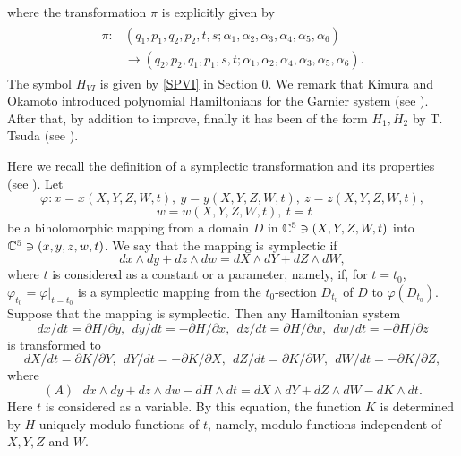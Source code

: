 where the transformation $\pi$ is explicitly given by
\begin{align}
\begin{split}
\pi:&(q_1,p_1,q_2,p_2,t,s;\alpha_1,\alpha_2,\alpha_3,\alpha_4,\alpha_5,\alpha_6)\\
&\rightarrow(q_2,p_2,q_1,p_1,s,t;\alpha_1,\alpha_2,\alpha_4,\alpha_3,\alpha_5,\alpha_6).
\end{split}
\end{align}
The symbol $H_{VI}$ is given by \eqref{SPVI} in Section 0. We remark that Kimura and Okamoto introduced polynomial Hamiltonians for the Garnier system (see \cite{Oka}). After that, by addition to improve, finally it has been of the form $H_1,H_2$ by T. Tsuda (see \cite{Tsuda1,Tsuda2,Tsuda3,Tsuda4}).




Here we recall the definition of a symplectic transformation and its properties (see \cite{T1}). Let
$$
\varphi : x=x(X,Y,Z,W,t), \  y=y(X,Y,Z,W,t), \  z=z(X,Y,Z,W,t),
$$
$$
 \  w=w(X,Y,Z,W,t), \ t=t
$$
be a biholomorphic mapping from a domain $D$ in ${\Bbb C}^5 \ni (X,Y,Z,W,t)$ into ${\Bbb C}^5 \ni (x,y,z,w,t)$. We say that the mapping is symplectic if
\begin{equation*}
dx \wedge dy + dz \wedge dw = dX \wedge dY + dZ \wedge dW,
\end{equation*}
where $t$ is considered as a constant or a parameter, namely, if, for $t=t_0$, ${\varphi}_{t_0}=\varphi|_{t=t_0}$ is a symplectic mapping from the $t_0$-section $D_{t_0}$ of $D$ to $\varphi(D_{t_0})$. Suppose that the mapping is symplectic. Then any Hamiltonian system
$$
dx/dt=\partial H/\partial y, \ \  dy/dt=-\partial H/\partial x, \ \  dz/dt=\partial H/\partial w, \ \ dw/dt=-\partial H/\partial z
$$
is transformed to
$$
dX/dt=\partial K/\partial Y, \ \  dY/dt=-\partial K/\partial X, \ \ dZ/dt=\partial K/\partial W, \ \ dW/dt=-\partial K/\partial Z,
$$
where
\begin{equation*}\label{A}
(A) \ \ \ dx \wedge dy +dz \wedge dw - dH \wedge dt =dX \wedge dY +dZ \wedge dW - dK \wedge dt.
\end{equation*}
Here $t$ is considered as a variable. By this equation, the function $K$ is determined by $H$ uniquely modulo functions of $t$, namely, modulo functions independent of $X,Y,Z$ and $W$.



